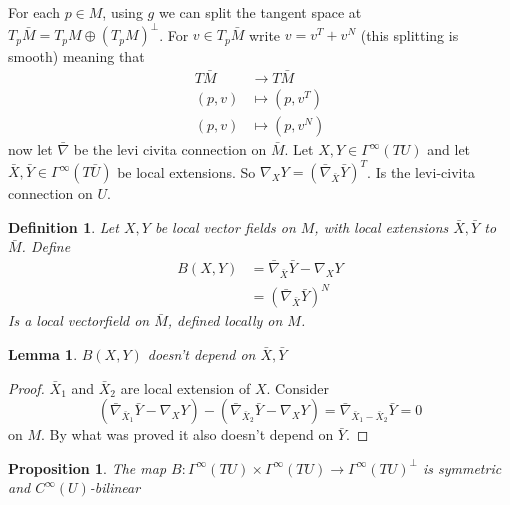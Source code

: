 \documentclass[a4paper]{article}
\newtheorem*{prop}{Proposition}
\newtheorem*{defn}{Definition}
\newtheorem*{lem}{Lemma}
\begin{document}
For each $p \in M$, using $g$ we can split the tangent space at $T_p\bar{M} = T_pM \oplus (T_pM)^\perp$. For $v \in T_p\bar{M}$ write $v = v^T + v^N$ (this splitting is smooth) meaning that
\[
  \begin{aligned}
    T\bar{M} &\rightarrow T\bar{M} \\
    (p,v) &\mapsto (p, v^T) \\
    (p,v) &\mapsto (p,v^N) 
  \end{aligned}
\]
now let $\bar{\nabla}$ be the levi civita connection on $\bar{M}$. Let $X,Y \in \Gamma^{\infty}(TU)$ and let $\bar{X},\bar{Y} \in \Gamma^\infty(T\bar{U})$ be local extensions. So $\nabla_X Y = (\bar{\nabla}_{\bar{X}}\bar{Y})^T$. Is the levi-civita connection on $U$. 
\begin{defn}
  Let $X,Y$ be local vector fields on $M$, with local extensions $\bar{X}, \bar{Y}$ to $\bar{M}$. Define
  \[
    \begin{aligned}
      B(X,Y) &= \bar{\nabla}_{\bar{X}}\bar{Y} - \nabla_X Y \\
             &= (\bar{\nabla}_{\bar{X}}\bar{Y})^N
    \end{aligned}
  \]
  Is a local vectorfield on $\bar{M}$, defined locally on $M$.
\end{defn}

\begin{lem}
  $B(X,Y)$ doesn't depend on $\bar{X}, \bar{Y}$
\end{lem}
\begin{proof}
  $\bar{X}_1$ and $\bar{X}_2$ are local extension of $X$. Consider
  \[
    (\bar{\nabla}_{\bar{X}_1}\bar{Y} - \nabla_X Y) - (\bar{\nabla}_{\bar{X}_2}\bar{Y} - \nabla_X Y) = \bar{\nabla}_{\bar{X}_1 - \bar{X}_2} \bar{Y} = 0
  \]
  on $M$. By what was proved it also doesn't depend on $\bar{Y}$.
\end{proof}

\begin{prop}
  The map $B: \Gamma^\infty(TU) \times \Gamma^\infty(TU) \rightarrow \Gamma^\infty(TU)^\perp$ is symmetric and $C^\infty(U)$-bilinear
\end{prop}
\end{document}
